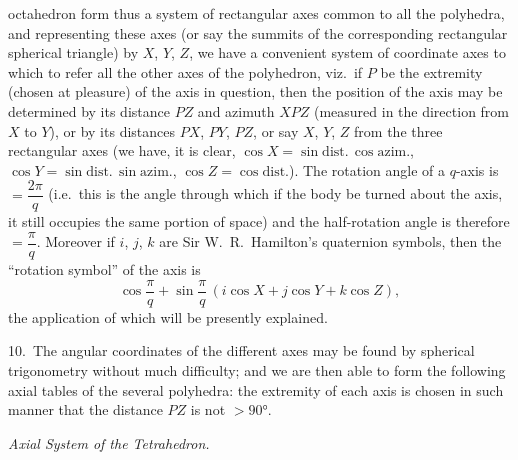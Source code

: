 \documentclass[11pt,a4paper]{article}
\begin{document}
\vspace{12pt}

\noindent
octahedron form thus a system of rectangular axes common to all the polyhedra, and representing these axes (or say the summits of the corresponding rectangular spherical triangle) by $X$, $Y$, $Z$, we have a convenient system of coordinate axes to which to refer all the other axes of the polyhedron, viz.~if $P$ be the extremity (chosen at pleasure) of the axis in question, then the position of the axis may be determined by its distance $PZ$ and azimuth $XPZ$ (measured in the direction from $X$ to $Y$), or by its distances $PX$, $PY$, $PZ$, or say $X$, $Y$, $Z$ from the three rectangular axes (we have, it is clear, $\cos X = \sin \text{dist.}\,\cos \text{azim.}$, $\cos Y = \sin \text{dist.}\,\sin \text{azim.}$, $\cos Z = \cos \text{dist.}$). The rotation angle of a $q$-axis is $= \dfrac{2\pi}{q}$ (i.e.~this is the angle through which if the body be turned about the axis, it still occupies the same portion of space) and the half-rotation angle is therefore $= \dfrac{\pi}{q}$. Moreover if $i$, $j$, $k$ are Sir W.~R.~Hamilton's quaternion symbols, then the ``rotation symbol'' of the axis is
\[
\cos \frac{\pi}{q} + \sin \frac{\pi}{q}\,(i\cos X + j\cos Y + k\cos Z),
\]
the application of which will be presently explained.

10.~The angular coordinates of the different axes may be found by spherical trigonometry without much difficulty; and we are then able to form the following axial tables of the several polyhedra: the extremity of each axis is chosen in such manner that the distance $PZ$ is not $> 90°$.

\begin{center}
\textit{Axial System of the Tetrahedron.}
\end{center}
\end{document}

